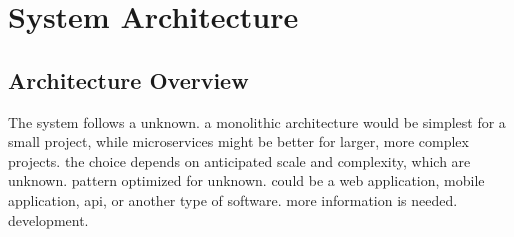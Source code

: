 \documentclass[11pt,a4paper,oneside]{article}
\begin{document}
\section{System Architecture}

\subsection{Architecture Overview}

The system follows a unknown.  a monolithic architecture would be simplest for a small project, while microservices might be better for larger, more complex projects.  the choice depends on anticipated scale and complexity, which are unknown. pattern optimized for unknown.  could be a web application, mobile application, api, or another type of software.  more information is needed. development.
\end{document}
